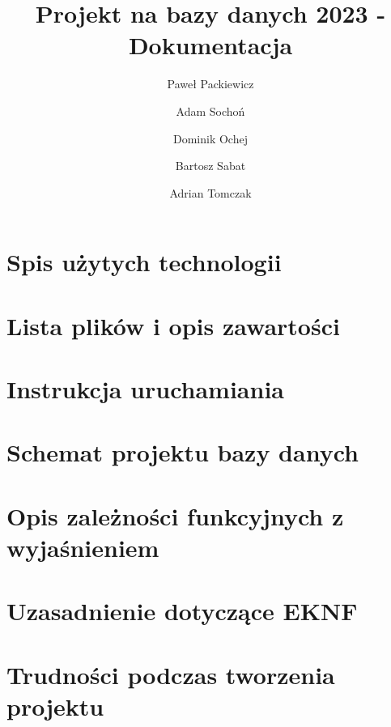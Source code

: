 \documentclass[12pt,a4paper]{article}
\begin{document}
\title{Projekt na bazy danych 2023 - Dokumentacja}
\author{Paweł Packiewicz \and Adam Sochoń \and Dominik Ochej \and Bartosz Sabat \and Adrian Tomczak}
\maketitle
\tableofcontents
\section{Spis użytych technologii}

\section{Lista plików i opis zawartości}

\section{Instrukcja uruchamiania}

\section{Schemat projektu bazy danych}

\section{Opis zależności funkcyjnych z wyjaśnieniem}

\section{Uzasadnienie dotyczące EKNF}

\section{Trudności podczas tworzenia projektu}
\end{document}
